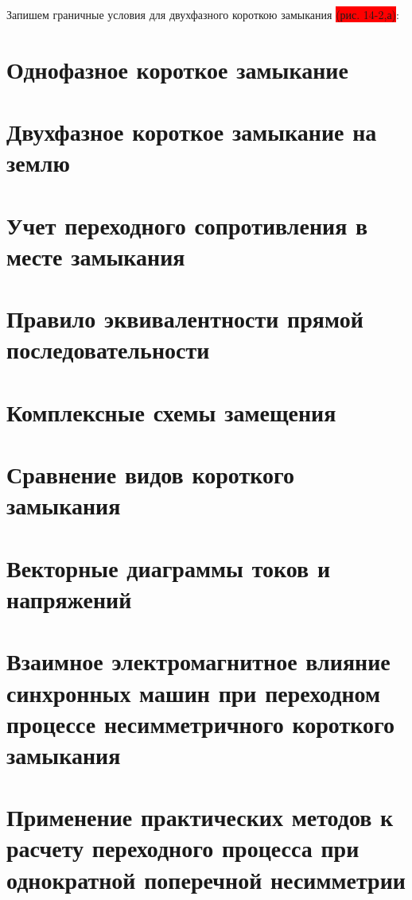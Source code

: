 Запишем граничные условия для двухфазного короткою замыкания \colorbox{red}{(рис. 14-2,а)}:


\section{Однофазное короткое замыкание}
\label{sec:14-3}


\section{Двухфазное короткое замыкание на землю}
\label{sec:14-4}


\section{Учет переходного сопротивления в месте замыкания}
\label{sec:14-5}


\section{Правило эквивалентности прямой последовательности}
\label{sec:14-6}


\section{Комплексные схемы замещения}
\label{sec:14-7}


\section{Сравнение видов короткого замыкания}
\label{sec:14-8}


\section{Векторные диаграммы токов и напряжений}
\label{sec:14-9}


\section{Взаимное электромагнитное влияние синхронных машин при переходном процессе несимметричного короткого замыкания}
\label{sec:14-10}


\section{Применение практических методов к расчету переходного процесса при однократной поперечной несимметрии}
\label{sec:14-11}